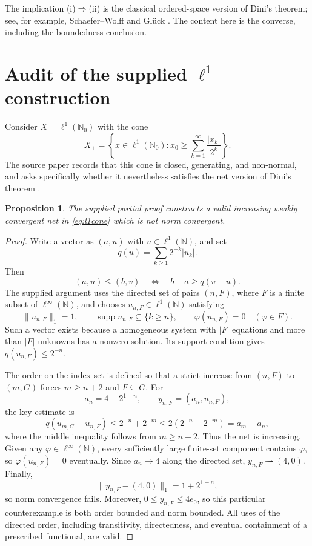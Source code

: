 \documentclass[11pt]{article}
\newtheorem{proposition}[theorem]{Proposition}
\theoremstyle{remark}
\newcommand{\norm}[1]{\lVert #1\rVert}
\newcommand{\supp}{\operatorname{supp}}
\begin{document}
The implication (i)$\Rightarrow$(ii) is the classical ordered-space version
of Dini's theorem; see, for example, Schaefer--Wolff
\cite[Section~V.4.3]{SchaeferWolff1999} and Gl\"uck
\cite[Corollary~4.2]{Glueck2025}.  The content here is the converse,
including the boundedness conclusion.

\section{Audit of the supplied \texorpdfstring{$\ell^1$}{l1} construction}

Consider $X=\ell^1(\mathbb N_0)$ with the cone
\begin{equation}\label{eq:l1cone}
 X_+
 =\left\{x\in\ell^1(\mathbb N_0):
 x_0\geq\sum_{k=1}^{\infty}\frac{|x_k|}{2^k}\right\}.
\end{equation}
The source paper records that this cone is closed, generating, and
non-normal, and asks specifically whether it nevertheless satisfies the
net version of Dini's theorem \cite[Example~6.1 and Open
Problem~6.2]{Glueck2025}.

\begin{proposition}\label{prop:audit}
The supplied partial proof constructs a valid increasing weakly convergent
net in \eqref{eq:l1cone} which is not norm convergent.
\end{proposition}

\begin{proof}
Write a vector as $(a,u)$ with $u\in\ell^1(\mathbb N)$, and set
\[
  q(u)=\sum_{k\geq1}2^{-k}|u_k|.
\]
Then
\[
 (a,u)\leq(b,v) \quad\Longleftrightarrow\quad b-a\geq q(v-u).
\]
The supplied argument uses the directed set of pairs $(n,F)$, where $F$ is
a finite subset of $\ell^\infty(\mathbb N)$, and chooses
$u_{n,F}\in\ell^1(\mathbb N)$ satisfying
\[
 \norm{u_{n,F}}_1=1,
 \qquad
 \supp u_{n,F}\subseteq\{k\geq n\},
 \qquad
 \varphi(u_{n,F})=0\quad(\varphi\in F).
\]
Such a vector exists because a homogeneous system with $|F|$ equations and
more than $|F|$ unknowns has a nonzero solution.  Its support condition
gives $q(u_{n,F})\leq2^{-n}$.

The order on the index set is defined so that a strict increase from
$(n,F)$ to $(m,G)$ forces $m\geq n+2$ and $F\subseteq G$.  For
\[
 a_n=4-2^{1-n},
 \qquad
 y_{n,F}=(a_n,u_{n,F}),
\]
the key estimate is
\[
 q(u_{m,G}-u_{n,F})
 \leq 2^{-n}+2^{-m}
 \leq 2(2^{-n}-2^{-m})
 =a_m-a_n,
\]
where the middle inequality follows from $m\geq n+2$.  Thus the net is
increasing.  Given any $\varphi\in\ell^\infty(\mathbb N)$, every sufficiently
large finite-set component contains $\varphi$, so
$\varphi(u_{n,F})=0$ eventually.  Since $a_n\to4$ along the directed set,
$y_{n,F}\rightharpoonup(4,0)$.  Finally,
\[
 \norm{y_{n,F}-(4,0)}_1=1+2^{1-n},
\]
so norm convergence fails.  Moreover, $0\leq y_{n,F}\leq4e_0$, so this
particular counterexample is both order bounded and norm bounded.  All uses
of the directed order, including transitivity, directedness, and eventual
containment of a prescribed functional, are valid.
\end{proof}
\end{document}
